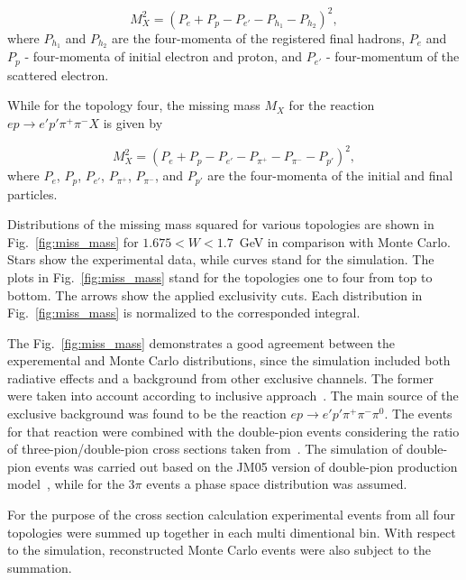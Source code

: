 \documentclass[prc,twocolumn,superscriptaddress,showpacs,amssymb,amsmath,amsfonts,linenumbers,aps]{revtex4-1}
\begin{document}
\begin{equation}
M_{X}^{2} = (P_{e} + P_{p} -P_{e'} - P_{h_1} - P_{h_2})^{2},
\label{eg:miss_mass}
\end{equation} 
where $P_{h_1}$ and $P_{h_2}$ are the four-momenta of the registered final hadrons, $P_{e}$ and $P_{p}$ - four-momenta of initial electron and proton, and $P_{e'}$ - four-momentum of the scattered electron.

While for the topology four, the missing mass $M_{X}$ for the reaction $e p \rightarrow e' p' \pi^+ \pi^- X$ is given by

\begin{equation}
M_{X}^{2} = (P_{e} + P_{p} -P_{e'} - P_{\pi^+} - P_{\pi^-} - P_{p'})^{2},
\label{eg:miss_mass_zero}
\end{equation} 
where $P_{e}$, $P_{p}$, $P_{e'}$, $P_{\pi^+}$, $P_{\pi^-}$,  and $P_{p'}$  are the four-momenta of the initial and final particles.

 


Distributions of the missing mass squared for various topologies are shown in Fig.~\ref{fig:miss_mass} for $1.675 < W < 1.7$~GeV in comparison with Monte Carlo. Stars show the experimental data, while curves stand for the simulation.
The plots in Fig.~\ref{fig:miss_mass} stand for the topologies one to four from top to bottom. The arrows show the applied exclusivity cuts. 
Each distribution in Fig.~\ref{fig:miss_mass} is normalized to the corresponded integral.

 
The Fig.~\ref{fig:miss_mass} demonstrates a good agreement between the experemental and Monte Carlo distributions,  since the simulation included both radiative effects and a background from other exclusive channels. 
The former were taken into account according to inclusive approach~\cite{Mo:1968cg}. 
The main source of the exclusive background was found to be the reaction $e p \rightarrow e' p' \pi^{+} \pi^{-} \pi^{0}$. The events for that reaction were combined with the double-pion events 
considering the ratio of three-pion/double-pion cross sections
 taken from~\cite{Wu:2005wf}. The simulation of double-pion events was carried out based on the JM05 version of double-pion production model~\cite{Ripani:2000va,Aznauryan:2005tp,Mokeev:2005re}, while for the $3\pi$ events a phase space distribution was assumed. 
 
For the purpose of the cross section calculation experimental events from all four topologies were summed up together in each multi dimentional bin. With respect to the simulation,  reconstructed Monte Carlo events were also subject to the summation.
\end{document}
